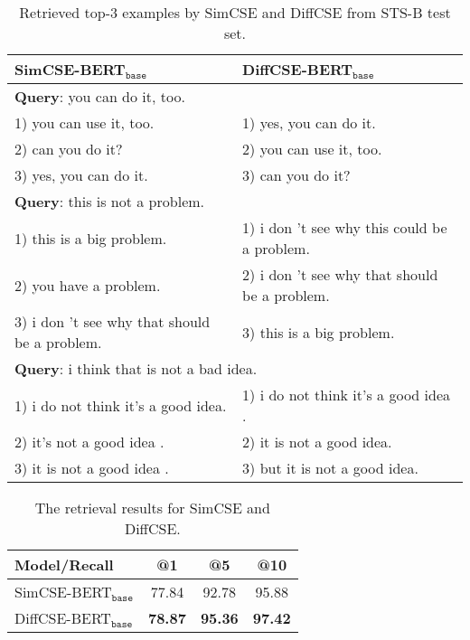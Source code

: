 \documentclass[11pt]{article}
\newcommand{\ba}{$_\texttt{base}$\xspace}
\newcommand\tf[1]{\textbf{#1}}
\begin{document}
\begin{table}[t]
    \centering
    \scriptsize
    \begin{tabular}{p{3.5cm}|p{3.5cm}}
        \toprule
        \tf{SimCSE-BERT\ba} & \tf{DiffCSE-BERT\ba}  \\
        \midrule
        \multicolumn{2}{l}{\tf{Query}: you can do it, too.} \\
        \midrule
        1) you can use it, too. & 1) yes, you can do it. \\
        2) can you do it? & 2) you can use it, too. \\
        3) yes, you can do it. & 3) can you do it? \\
        \midrule
        \multicolumn{2}{l}{\tf{Query}: this is not a problem.} \\
        \midrule
        1) this is a big problem. & 1) i don 't see why this could be a problem. \\
        2) you have a problem. & 2) i don 't see why that should be a problem. \\
        3) i don 't see why that should be a problem. & 3) this is a big problem. \\
        \midrule
        \multicolumn{2}{l}{\tf{Query}: i think that is not a bad idea.} \\
        \midrule
        1) i do not think it's a good idea. & 1) i do not think it's a good idea . \\
        2) it's not a good idea . & 2) it is not a good idea. \\
        3) it is not a good idea . & 3) but it is not a good idea. \\
        \bottomrule
    \end{tabular}
    \vspace{-2mm}
    \caption{Retrieved top-3 examples by SimCSE and DiffCSE from STS-B test set. }
    \label{tab:top-3}
    \vspace{-3mm}
\end{table}

\begin{table}[t]
    \begin{center}
    \centering
    \small
    \begin{tabular}{l|ccc}
    \toprule
       \bf Model/Recall & \bf @1 & \bf @5 & \bf @10 \\
    \midrule
        SimCSE-BERT\ba & 77.84 & 92.78 & 95.88 \\
        DiffCSE-BERT\ba & \bf 78.87 & \bf 95.36 & \bf 97.42 \\
    \bottomrule
    \end{tabular}
    \end{center}
    \vspace{-3mm}
    \caption{
        The retrieval results for SimCSE and DiffCSE.
    }
    \label{tab:retrieval}
    \vspace{-2mm}
\end{table}
 
\end{document}
